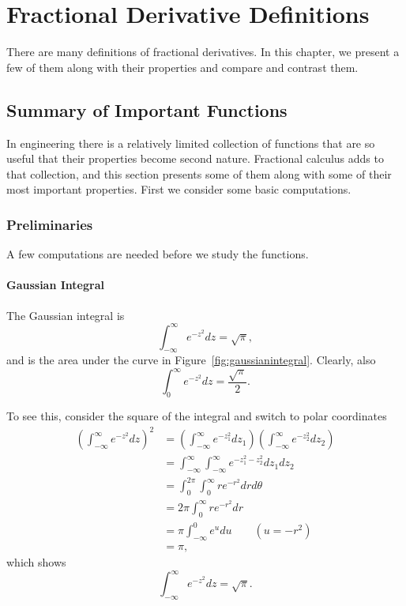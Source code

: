 \chapter{Fractional Derivative Definitions}

There are many definitions of fractional derivatives. In this chapter, we present a few of them along with their properties and compare and contrast them.
\section{Summary of Important Functions}

In engineering there is a relatively limited collection of functions that are so useful that their properties become second nature. Fractional calculus adds to that collection, and this section presents some of them along with some of their most important properties. First we consider some basic computations.

\subsection{Preliminaries}

A few computations are needed before we study the functions. 

\subsubsection{Gaussian Integral}
The Gaussian integral is
\begin{equation}
  \boxed {\int_{-\infty}^\infty e^{-z^2} dz = \sqrt{\pi}, }
  \label{eq:gaussianintegral}
\end{equation}
and is the area under the curve in Figure~\ref{fig:gaussianintegral}. Clearly, also
\begin{equation*}
  \int_0^\infty e^{-z^2} dz = \frac{\sqrt{\pi}}{2}.
\end{equation*}

To see this, consider the square of the integral and switch to polar coordinates
\begin{align*}
  \left( \int_{-\infty}^\infty e^{-z^2} dz \right)^2 &= \left( \int_{-\infty}^\infty e^{-z_1^2} dz_1 \right) \left( \int_{-\infty}^\infty e^{-z_2^2} dz_2 \right) \\
  &= \int_{-\infty}^{\infty} \int_{-\infty}^{\infty} e^{-z_1^2 - z_2^2} dz_1 dz_2 \\
  &= \int_0^{2 \pi} \int_0^\infty r e^{-r^2} dr d\theta \\
  &= 2 \pi \int_0^\infty r e^{-r^2} dr \\
  &= \pi \int_{-\infty}^0 e^u du \qquad (u = -r^2) \\
  &= \pi,
\end{align*}
which shows
\begin{equation*}
  \int_{-\infty}^{\infty} e^{-z^2} dz = \sqrt{\pi}.
\end{equation*}

